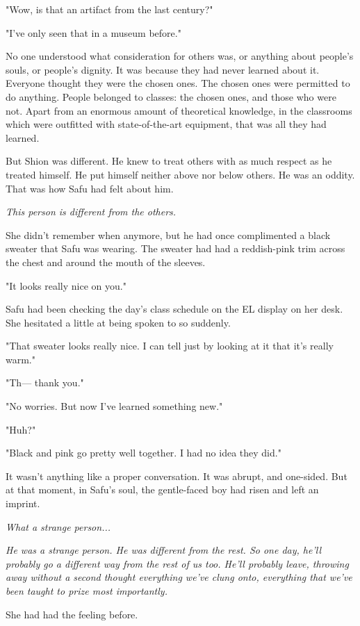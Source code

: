 "Wow, is that an artifact from the last century?"

"I've only seen that in a museum before."

No one understood what consideration for others was, or anything about
people's souls, or people's dignity. It was because they had never
learned about it. Everyone thought they were the chosen ones. The chosen
ones were permitted to do anything. People belonged to classes: the
chosen ones, and those who were not. Apart from an enormous amount of
theoretical knowledge, in the classrooms which were outfitted with
state-of-the-art equipment, that was all they had learned.

But Shion was different. He knew to treat others with as much respect as
he treated himself. He put himself neither above nor below others. He
was an oddity. That was how Safu had felt about him.

\emph{This person is different from the others.}

She didn't remember when anymore, but he had once complimented a black
sweater that Safu was wearing. The sweater had had a reddish-pink trim
across the chest and around the mouth of the sleeves.

"It looks really nice on you."

Safu had been checking the day's class schedule on the EL display on her
desk. She hesitated a little at being spoken to so suddenly.

"That sweater looks really nice. I can tell just by looking at it that
it's really warm."

"Th--- thank you."

"No worries. But now I've learned something new."

"Huh?"

"Black and pink go pretty well together. I had no idea they did."

It wasn't anything like a proper conversation. It was abrupt, and
one-sided. But at that moment, in Safu's soul, the gentle-faced boy had
risen and left an imprint.

\emph{What a strange person...}

\emph{He was a strange person. He was different from the rest. So one day,
he'll probably go a different way from the rest of us too. He'll
probably leave, throwing away without a second thought everything we've
clung onto, everything that we've been taught to prize most importantly.}

She had had the feeling before.

